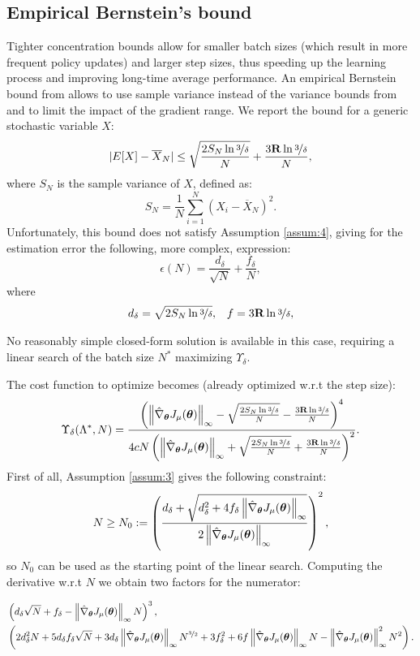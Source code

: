 \subsection{Empirical Bernstein's bound}
Tighter concentration bounds allow for smaller batch sizes (which result in more frequent policy updates) and larger step sizes, thus speeding up the learning process and improving long-time average performance. An empirical Bernstein bound from \cite{Mnih:2008:EBS:1390156.1390241} allows to use sample variance instead of the variance bounds from \cite{DBLP:journals/nn/ZhaoHNS12} and to limit the impact of the gradient range. We report the bound for a generic stochastic variable $X$:
\[
	|E[X] - \overline{X}_N| \leq  \sqrt{\frac{2S_N\ln{\nicefrac{3}{\delta}}}{N}}
		+ \frac{3\mathbf{R}\ln{\nicefrac{3}{\delta}}}{N},
\]
where $S_N$ is the sample variance of $X$, defined as:
\[
	S_N = \frac{1}{N}\sum\limits_{i=1}^N(X_i - \overline{X}_N)^2.
\]
Unfortunately, this bound does not satisfy Assumption \ref{assum:4}, giving for the estimation error the following, more complex, expression:
 \[
 \epsilon(N) = \frac{d_\delta}{\sqrt{N}} + \frac{f_\delta}{N},
\]
where
\begin{align*}
d_\delta= \sqrt{2S_N\ln{\nicefrac{3}{\delta}}}, && f=3\mathbf{R}\ln{\nicefrac{3}{\delta}},
\end{align*}

No reasonably simple closed-form solution is available in this case, requiring a linear search of the batch size $N^*$ maximizing $\Upsilon_\delta$. 

The cost function to optimize becomes (already optimized w.r.t the step size):
\[
\Upsilon_{\delta}(\Lambda^*,N) = \frac{\left(\norm[\infty]{\gradApp{\vtheta}} - 
		\sqrt{\frac{2S_N\ln{\nicefrac{3}{\delta}}}{N}} - \frac{3\mathbf{R}\ln{\nicefrac{3}{\delta}}}{N}\right)^4}
		{4cN
		\left(\norm[\infty]{\gradApp{\vtheta}} + 
				\sqrt{\frac{2S_N\ln{\nicefrac{3}{\delta}}}{N}} + \frac{3\mathbf{R}\ln{\nicefrac{3}{\delta}}}{N}\right)^2}.
\]
First of all, Assumption \ref{assum:3} gives the following constraint:
\[
N \geq N_0 := \left(\frac{d_{\delta} + \sqrt{d_{\delta}^2 + 4f_{\delta}\norm[\infty]{\gradApp{\vtheta}}}}
{2\norm[\infty]{\gradApp{\vtheta}}}
\right)^2,
\]
so $N_0$ can be used as the starting point of the linear search.
Computing the derivative w.r.t $N$ we obtain two factors for the numerator:

\begin{align*}
&\left(d_{\delta}\sqrt{N}+f_{\delta} - \norm[\infty]{\gradApp{\vtheta}}N\right)^3, \\
&\left(2d_{\delta}^2N+5d_{\delta}f_{\delta}\sqrt{N}+3d_{\delta}\norm[\infty]{\gradApp{\vtheta}}N^{\nicefrac{3}{2}} +3f_{\delta}^2+6f\norm[\infty]{\gradApp{\vtheta}}N-\norm[\infty]{\gradApp{\vtheta}}^2N^2\right).
\end{align*}

